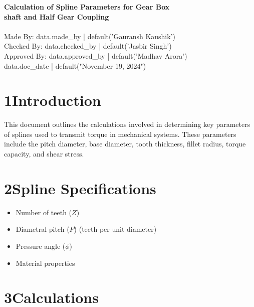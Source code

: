 \documentclass[14pt]{article}
\begin{document}
\vspace*{1cm}

\begin{center}
{\LARGE\color{black}\textbf{Calculation of Spline Parameters for Gear Box\\
shaft and Half Gear Coupling}}\\[1ex]
\\[2ex]
{\color{black}Made By: {{ data.made_by | default('Gauransh Kaushik') }}}\\
{\color{black}Checked By: {{ data.checked_by | default('Jasbir Singh') }}}\\
{\color{black}Approved By: {{ data.approved_by | default('Madhav Arora') }}}\\[1ex]
{{ data.doc_date | default("November 19, 2024") }}
\end{center}

\thispagestyle{fancy}

\section*{1\quad Introduction}
This document outlines the calculations involved in determining key parameters of splines used
to transmit torque in mechanical systems. These parameters include the pitch diameter, base
diameter, tooth thickness, fillet radius, torque capacity, and shear stress.

\section*{2\quad Spline Specifications}
\begin{itemize}
  \item Number of teeth ($Z$)
  \item Diametral pitch ($P$) (teeth per unit diameter)
  \item Pressure angle ($\phi$)
  \item Material properties
\end{itemize}

\section*{3\quad Calculations}
\end{document}

